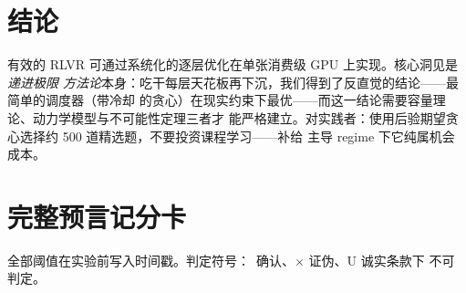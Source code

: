\documentclass[11pt]{article}
\theoremstyle{definition}
\begin{document}
\section{结论}\label{sec:concl}
有效的 RLVR 可通过系统化的逐层优化在单张消费级 GPU 上实现。核心洞见是\emph{递进极限
方法论}本身：吃干每层天花板再下沉，我们得到了反直觉的结论——最简单的调度器（带冷却
的贪心）在现实约束下最优——而这一结论需要容量理论、动力学模型与不可能性定理三者才
能严格建立。对实践者：使用后验期望贪心选择约 500 道精选题，不要投资课程学习——补给
主导 regime 下它纯属机会成本。




\appendix

\section{完整预言记分卡}\label{app:scorecard}
全部阈值在实验前写入时间戳。判定符号：\checkmark\ 确认、$\times$ 证伪、U 诚实条款下
不可判定。
\end{document}
